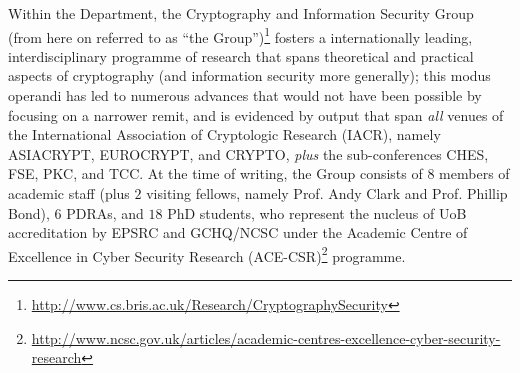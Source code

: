 Within the Department, the Cryptography and Information Security Group
(from here on referred to as ``the Group'')\footnote{
\url{http://www.cs.bris.ac.uk/Research/CryptographySecurity}
} fosters a internationally leading, interdisciplinary programme of
research that spans theoretical and practical aspects of cryptography 
(and information security more generally); this modus operandi has led 
to numerous advances that would not have been possible by focusing on 
a narrower remit, and is evidenced by output that span {\em all} venues 
of the International Association of Cryptologic Research (IACR), namely 
ASIACRYPT, EUROCRYPT, and CRYPTO, 
{\em plus} the sub-conferences 
CHES, FSE, PKC, and TCC.
At the time of writing, the Group consists of 
 $8$ members of academic staff (plus $2$ visiting fellows, namely Prof. Andy Clark and Prof. Phillip Bond),
 $6$ PDRAs,
and 
$18$ PhD students,
who represent the nucleus of UoB accreditation by EPSRC and GCHQ/NCSC 
under the Academic Centre of Excellence in Cyber Security Research 
(ACE-CSR)\footnote{
\url{http://www.ncsc.gov.uk/articles/academic-centres-excellence-cyber-security-research}
} programme.  
%
%
% 
% 
